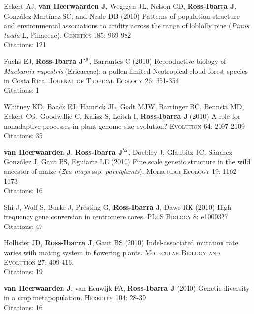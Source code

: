 \documentclass[letterpaper]{article}
\begin{document}
\begin{etaremune}
\item Eckert AJ, {\bf van Heerwaarden J}, Wegrzyn JL, Nelson CD, {\bf Ross-Ibarra J}, Gonz\'{a}lez-Mart\'{i}nez SC, and Neale DB (2010) Patterns of population structure and environmental associations to aridity across the range of loblolly pine (\emph{Pinus taeda} L, Pinaceae).  \textsc{Genetics} 185: 969-982
\\Citations: 121\\

\item Fuchs EJ, {\bf Ross-Ibarra J}$^\S$, Barrantes G (2010) Reproductive biology of \emph{Macleania rupestris} (Ericaceae): a pollen-limited Neotropical cloud-forest species in Costa Rica.  \textsc{Journal of Tropical Ecology} 26: 351-354
\\Citations: 1\\

\item Whitney KD, Baack EJ, Hamrick JL, Godt MJW, Barringer BC, Bennett MD, Eckert CG, Goodwillie C, Kalisz S, Leitch I, {\bf Ross-Ibarra J} (2010) A role for nonadaptive processes in plant genome size evolution?  \textsc{Evolution} 64: 2097-2109
\\Citations: 35\\

\item {\bf van Heerwaarden J}, {\bf Ross-Ibarra J}$^\S$, Doebley J, Glaubitz JC, S\'{a}nchez Gonz\'{a}lez J, Gaut BS, Eguiarte LE (2010) Fine scale genetic structure in the wild ancestor of maize (\emph{Zea mays} ssp. \emph{parviglumis}).  \textsc{Molecular Ecology} 19: 1162-1173
\\Citations: 16\\

\item Shi J, Wolf S, Burke J, Presting G, {\bf Ross-Ibarra J}, Dawe RK (2010) High frequency gene conversion in centromere cores.  \textsc{PLoS Biology} 8: e1000327
\\Citations: 47\\

\item Hollister JD, {\bf Ross-Ibarra J}, Gaut BS (2010) Indel-associated mutation rate varies with mating system in flowering plants.  \textsc{Molecular Biology and Evolution} 27: 409-416.
\\Citations: 19\\

\item {\bf van Heerwaarden J}, van Eeuwijk FA, {\bf Ross-Ibarra J} (2010) Genetic diversity in a crop metapopulation.  \textsc{Heredity} 104: 28-39
\\Citations: 16\\


\end{etaremune}
\end{document}
